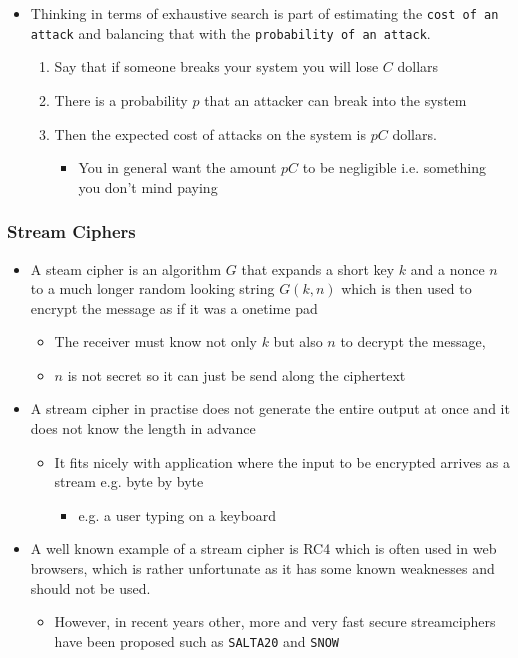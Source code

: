 \documentclass[11pt]{article}
\begin{document}
\begin{itemize}
\item Thinking in terms of exhaustive search is part of estimating the \texttt{cost of an attack} and balancing that with the \texttt{probability of an attack}.
\begin{enumerate}
\item Say that if someone breaks your system you will lose \(C\) dollars
\item There is a probability \(p\) that an attacker can break into the system
\item Then the expected cost of attacks on the system is \(pC\) dollars.
\begin{itemize}
\item You in general want the amount \(pC\) to be negligible i.e. something you don't mind paying
\end{itemize}
\end{enumerate}
\end{itemize}

\subsubsection{Stream Ciphers}
\label{sec:orgd8b4cfc}
\begin{itemize}
\item A steam cipher is an algorithm \(G\) that expands a short key \(k\) and a nonce \(n\) to a much longer random looking string \(G(k,n)\) which is then used to encrypt the message as if it was a onetime pad
\begin{itemize}
\item The receiver must know not only \(k\) but also \(n\) to decrypt the message,
\item \(n\) is not secret so it can just be send along the ciphertext
\end{itemize}

\item A stream cipher in practise does not generate the entire output at once and it does not know the length in advance
\begin{itemize}
\item It fits nicely with application where the input to be encrypted arrives as a stream e.g. byte by byte
\begin{itemize}
\item e.g. a user typing on a keyboard
\end{itemize}
\end{itemize}

\item A well known example of a stream cipher is RC4 which is often used in web browsers, which is rather unfortunate as it has some known weaknesses and should not be used.
\begin{itemize}
\item However, in recent years other, more and very fast secure streamciphers have been proposed such as \texttt{SALTA20} and \texttt{SNOW}
\end{itemize}
\end{itemize}
\end{document}
